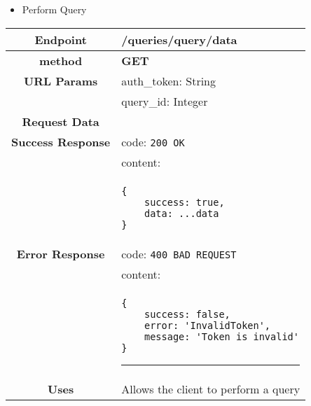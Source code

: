     \begin{itemize}
        \item Perform Query
    \end{itemize}
    \begin{adjustwidth}{1cm}{}
        \begin{longtable}{|c|l|}
            \hline
            \textbf{Endpoint} & /queries/query/data \\
            \hline
            \textbf{method} & \textbf{GET} \\
            \hline
            \textbf{URL Params} &  auth\_token: String \\
            &  query\_id: Integer \\
            \hline
            \textbf{Request Data} & \\
            \hline
            \textbf{Success Response} & code: \texttt{200 OK} \\
            &                           content: \\
            & \begin{minipage}[t]{0.5\textwidth}
                \begin{adjustwidth}{1.5cm}{}
                \begin{verbatim}
{
    success: true, 
    data: ...data
}
                \end{verbatim}
                \end{adjustwidth}
              \end{minipage} \\
              \hline
            \textbf{Error Response} & code: \texttt{400 BAD REQUEST} \\
              &                     content: \\
              & \begin{minipage}[t]{0.7\textwidth}
                \begin{adjustwidth}{1.5cm}{}
                \begin{verbatim}
{
    success: false, 
    error: 'InvalidToken',
    message: 'Token is invalid'
}
                \end{verbatim}
                \end{adjustwidth}
                \par\noindent\rule{\textwidth}{1pt}
                 \vspace{4pt}
              \end{minipage} \\
              \hline
            \textbf{Uses} & Allows the client to perform a query \\

\end{longtable}
\end{adjustwidth}
